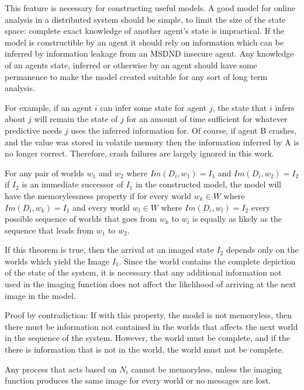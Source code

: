 This feature is necessary for constructing useful models. A good model for online analysis in a distributed system should be simple, to limit the size of the state space: complete exact knowledge of another agent's state is impractical. If the model is constructible by an agent it should rely on information which can be inferred by information leakage from an MSDND insecure agent. Any knowledge of an agents state, inferred or otherwise by an agent should have some permanence to make the model created suitable for any sort of long term analysis. 

For example, if an agent $i$ can infer some state for agent $j$, the state that $i$ infers about $j$ will remain the state of $j$ for an amount of time sufficient for whatever predictive needs $j$ uses the inferred information for. Of course, if agent B crashes, and the value was stored in volatile memory then the information inferred by A is no longer correct. Therefore, crash failures are largely ignored in this work.


\begin{thm}
For any pair of worlds $w_1$ and $w_2$ where $Im(D_i, w_1)=I_1$ and $Im(D_i, w_2)=I_2$ if $I_2$ is an immediate successor of $I_1$ in the constructed model, the model will have the memorylessness property if for every world $w_k \in W$ where $Im(D_i, w_k)=I_1$ and every world $w_l \in W$ where $Im(D_i, w_l)=I_2$ every possible sequence of worlds that goes from $w_k$ to $w_l$ is equally as likely as the sequence that leads from $w_1$ to $w_2$. 
\end{thm}

If this theorem is true, then the arrival at an imaged state $I_2$ depends only on the worlds which yield the Image $I_1$. Since the world contains the complete depiction of the state of the system, it is necessary that any additional information not used in the imaging function does not affect the likelihood of arriving at the next image in the model.

Proof by contradiction: If with this property, the model is not memoryless, then there must be information not contained in the worlds that affects the next world in the sequence of the system. However, the world must be complete, and if the there is information that is not in the world, the world must not be complete.

\begin{thm}
Any process that acts based on $N_i$ cannot be memoryless, unless the imaging function produces the same image for every world or no messages are lost.
\end{thm}

